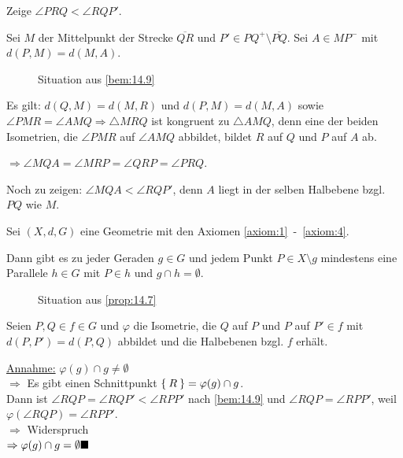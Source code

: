 \begin{beweis}
    Zeige $\angle PRQ < \angle RQP'$.

    Sei $M$ der Mittelpunkt der Strecke $\overline{QR}$ und $P' \in PQ^+ \setminus \overline{PQ}$.
    Sei $A \in MP^-$ mit $d(P,M) = d(M,A)$.


    \begin{figure}[ht]
        \centering

        \label{fig:winkel-und-parallelogramm}
        \caption{Situation aus \cref{bem:14.9}}
    \end{figure}

    Es gilt: $d(Q,M) = d(M,R)$ und $d(P,M) = d(M,A)$ sowie 
    $\angle PMR = \angle AMQ \Rightarrow \triangle MRQ$ ist
    kongruent zu $\triangle AMQ$, denn eine der beiden Isometrien, die
    $\angle PMR$ auf $\angle AMQ$ abbildet, bildet $R$ auf $Q$ und
    $P$ auf $A$ ab.

    $\Rightarrow \angle MQA = \angle MRP = \angle QRP = \angle PRQ$.

    Noch zu zeigen: $\angle MQA < \angle RQP'$, denn $A$ liegt in der
    selben Halbebene bzgl. $PQ$ wie $M$.
\end{beweis}

\begin{proposition}\label{prop:14.7}%
    Sei $(X, d, G)$ eine Geometrie mit den Axiomen \ref{axiom:1}~-~\ref{axiom:4}.

    Dann gibt es zu jeder Geraden $g \in G$ und jedem Punkt $P \in X \setminus g$ 
    mindestens eine Parallele $h \in G$ mit $P \in h$ und $g \cap h = \emptyset$.
\end{proposition}

\begin{figure}[htp]
    \centering
    
    \caption{Situation aus \cref{prop:14.7}}
    \label{fig:geometry-6}
\end{figure}

\begin{beweis}
    Seien $P, Q \in f \in G$ und $\varphi$ die Isometrie, die $Q$ auf $P$ und $P$ auf $P' \in f$
    mit $d(P,P') = d(P, Q)$ abbildet und die Halbebenen bzgl. $f$ erhält.

    \underline{Annahme:} $\varphi(g) \cap g \neq \emptyset$\\
    $\Rightarrow$ Es gibt einen Schnittpunkt $\Set{R} = \varphi(g) \cap g$.\\
    Dann ist $\angle RQP = \angle RQP' < \angle RPP'$ nach
    \cref{bem:14.9} und $\angle RQP = \angle RPP'$, weil
    $\varphi(\angle RQP) = \angle RPP'$.\\
    $\Rightarrow$ Widerspruch\\
    $\Rightarrow \varphi(g) \cap g = \emptyset \qed$
\end{beweis}

